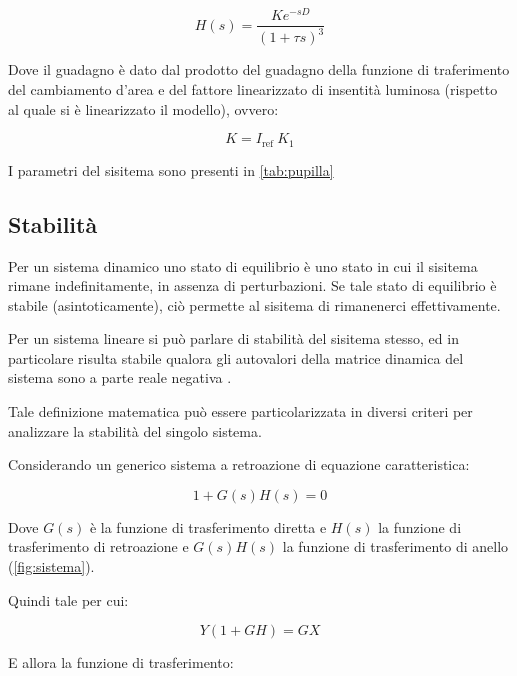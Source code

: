 \begin{equation}
	H(s)=\frac{K e^{-s D}}{(1+\tau s)^{3}}
\end{equation}

Dove il guadagno è dato dal prodotto del guadagno della funzione di traferimento del cambiamento d'area e del fattore linearizzato di insentità luminosa (rispetto al quale si è linearizzato il modello), ovvero:

\begin{equation}
	K=I_{\text {ref }} K_{1}
\end{equation}

I parametri del sisitema sono presenti in \cref{tab:pupilla}







\subsection{Stabilità}

Per un sistema dinamico uno stato di equilibrio è uno stato in cui il sisitema rimane indefinitamente, in assenza di perturbazioni. Se tale stato di equilibrio è stabile (asintoticamente), ciò permette al sisitema di rimanenerci effettivamente. 

Per un sistema lineare si può parlare di stabilità del sisitema stesso, ed in particolare risulta stabile qualora gli autovalori della matrice dinamica del sistema sono a parte reale negativa \cite{grasselli_sistemi_2008}.

Tale definizione matematica può essere particolarizzata in diversi criteri per analizzare la stabilità del singolo sistema.

Considerando un generico sistema a retroazione di equazione caratteristica:

\begin{equation}
	1+G(s)H(s)=0
			\label{eq:retroazione}
\end{equation}

Dove $G(s)$ è la funzione di trasferimento diretta e $H(s)$ la funzione di trasferimento di retroazione e $G(s)H(s)$ la funzione di trasferimento di anello (\cref{fig:sistema}).

Quindi tale per cui:

\begin{equation}
	Y(1+G H)=G X
\end{equation}

E allora la funzione di trasferimento:

